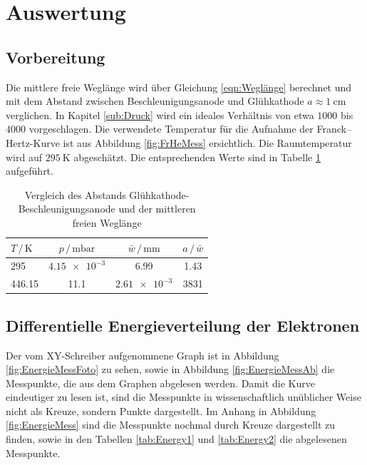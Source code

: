 \section{Auswertung}
\label{sec:Auswertung}

\subsection{Vorbereitung}
\label{sub:Vorbereitung}

Die mittlere freie Weglänge wird über Gleichung \eqref{eqn:Weglänge} berechnet und mit dem Abstand zwischen Beschleunigungsanode 
und Glühkathode $a\approx \SI{1}{\centi\meter}$ verglichen. In Kapitel \ref{sub:Druck} wird ein ideales Verhältnis von etwa $1000$ bis $4000$ vorgeschlagen. 
Die verwendete Temperatur für die Aufnahme der Franck--Hertz-Kurve ist aus Abbildung \ref{fig:FrHeMess} ersichtlich. 
Die Raumtemperatur wird auf $\SI{295}{\kelvin}$ abgeschätzt.
Die entsprechenden Werte sind in Tabelle \ref{tab:Weglänge} aufgeführt. 

\begin{table}
    \centering
    \caption{Vergleich des Abstands Glühkathode-Beschleunigungsanode und der mittleren freien Weglänge}
    \label{tab:Weglänge}
    \begin{tabular}{l c c c}
        \toprule
        $T\,/\,\si{\kelvin}$ & $p\,/\,\si{\milli\bar}$ & $\bar{w}\,/\,\si{\milli\meter}$ & $a\,/\,\bar{w}$ \\
        \midrule
        295    & $\num{4.15e-3}$ &  6.99            & 1.43 \\
        446.15 & 11.1            & $\num{2.61e-3}$  & 3831 \\
        \bottomrule
    \end{tabular}
\end{table}

\subsection{Differentielle Energieverteilung der Elektronen}

Der vom XY-Schreiber aufgenommene Graph ist in Abbildung \ref{fig:EnergieMessFoto} zu sehen, sowie in Abbildung \ref{fig:EnergieMessAb} die Messpunkte, die aus dem Graphen abgelesen werden. 
Damit die Kurve eindeutiger zu lesen ist, sind die Messpunkte in wissenschaftlich unüblicher Weise nicht als Kreuze, sondern Punkte dargestellt. 
Im Anhang in Abbildung \ref{fig:EnergieMess} sind die Messpunkte nochmal durch Kreuze dargestellt zu finden, sowie in den Tabellen \ref{tab:Energy1} und 
\ref{tab:Energy2} die abgelesenen Messpunkte. 

